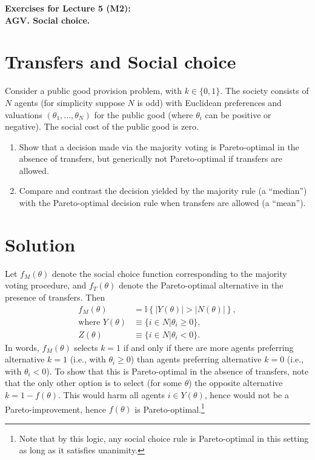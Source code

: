 \documentclass[a4paper]{article}
\newif\ifsolutions
\begin{document}
\begin{center}
		\LARGE\textbf{Exercises for Lecture 5 (M2):\\ AGV. Social choice.}
\end{center}



\section{Transfers and Social choice}
Consider a public good provision problem, with $k \in \{0,1\}$. The society consists of $N$ agents (for simplicity suppose $N$ is odd) with Euclidean preferences and valuations $(\theta_1, ..., \theta_N)$ for the public good (where $\theta_i$ can be positive or negative). The social cost of the public good is zero.

\begin{enumerate}
\item Show that a decision made via the majority voting is Pareto-optimal in the absence of transfers, but generically not Pareto-optimal if transfers are allowed.
\item Compare and contrast the decision yielded by the majority rule (a ``median'') with the Pareto-optimal decision rule when transfers are allowed (a ``mean'').
\end{enumerate}


\ifsolutions
\section*{Solution}
Let $f_M(\theta)$ denote the social choice function corresponding to the majority voting procedure, and $f_T(\theta)$ denote the Pareto-optimal alternative in the presence of transfers. Then
\begin{align*}
f_M(\theta) &= \mathbb{I} \left\{ |Y(\theta)| > |N(\theta)| \right\},
\\
\text{where } Y(\theta) &\equiv \{ i \in N | \theta_i \geq 0 \},
\\
Z(\theta) &\equiv \{ i \in N | \theta_i < 0 \}.
\end{align*}
In words, $f_M(\theta)$ selects $k=1$ if and only if there are more agents preferring alternative $k=1$ (i.e., with $\theta_i \geq 0$) than agents preferring alternative $k=0$ (i.e., with $\theta_i < 0$). To show that this is Pareto-optimal in the absence of transfers, note that the only other option is to select (for some $\theta$) the opposite alternative $k=1-f(\theta)$. This would harm all agents $i \in Y(\theta)$, hence would not be a Pareto-improvement, hence $f(\theta)$ is Pareto-optimal.\footnote{Note that by this logic, any social choice rule is Pareto-optimal in this setting as long as it satisfies unanimity.}
\end{document}
